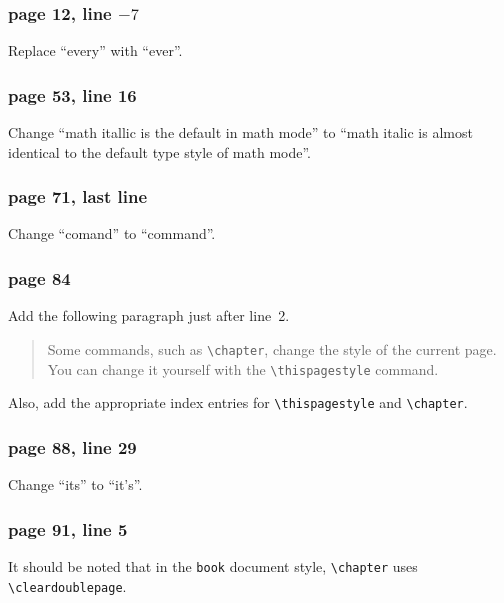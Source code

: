 \subsubsection*{page 12, line $-7$}
Replace ``every'' with ``ever''.

\subsubsection*{page 53, line 16}
Change ``math itallic is the default in math mode'' to ``math italic is
almost identical to the default type style of math mode''.

\subsubsection*{page 71, last line}
Change ``comand'' to ``command''.

\subsubsection*{page 84}
Add the following paragraph just after line~2.
\begin{quote}
Some commands, such as \verb|\chapter|, change the style of the current
page.  You can change it yourself with the \verb|\thispagestyle|
command.
\end{quote}
Also, add the appropriate index entries for \verb|\thispagestyle| and
\verb|\chapter|.

\subsubsection*{page 88, line 29}
Change ``its'' to ``it's''.

\subsubsection*{page 91, line 5}
\begin{sloppypar}
It should be noted that in the {\tt book} document style,
\verb|\chapter| uses \verb|\cleardoublepage|.
\end{sloppypar}

